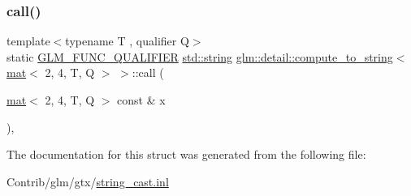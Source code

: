 \subsubsection{\texorpdfstring{call()}{call()}}
{\footnotesize\ttfamily template$<$typename T , qualifier Q$>$ \\
static \mbox{\hyperlink{setup_8hpp_a33fdea6f91c5f834105f7415e2a64407}{G\+L\+M\+\_\+\+F\+U\+N\+C\+\_\+\+Q\+U\+A\+L\+I\+F\+I\+ER}} \mbox{\hyperlink{_s_d_l__opengl__glext_8h_ae84541b4f3d8e1ea24ec0f466a8c568b}{std\+::string}} \mbox{\hyperlink{structglm_1_1detail_1_1compute__to__string}{glm\+::detail\+::compute\+\_\+to\+\_\+string}}$<$ \mbox{\hyperlink{structglm_1_1mat}{mat}}$<$ 2, 4, T, Q $>$ $>$\+::call (\begin{DoxyParamCaption}\item[{\mbox{\hyperlink{structglm_1_1mat}{mat}}$<$ 2, 4, T, Q $>$ const \&}]{x }\end{DoxyParamCaption})\hspace{0.3cm}{\ttfamily [inline]}, {\ttfamily [static]}}



The documentation for this struct was generated from the following file\+:\begin{DoxyCompactItemize}
\item 
Contrib/glm/gtx/\mbox{\hyperlink{string__cast_8inl}{string\+\_\+cast.\+inl}}\end{DoxyCompactItemize}
